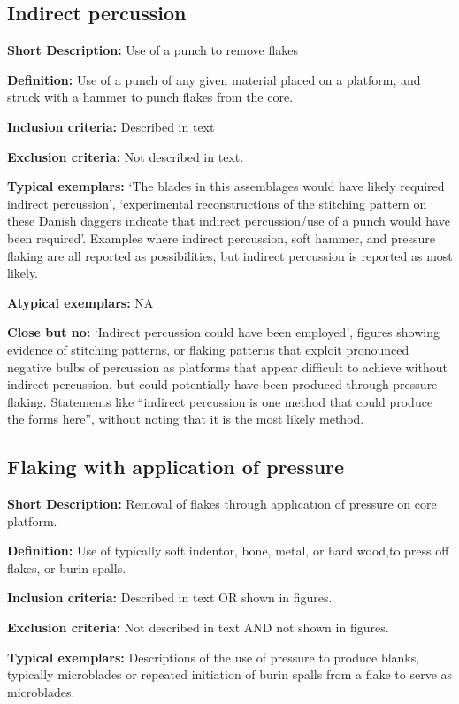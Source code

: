 \documentclass[
]{article}
\begin{document}
\subsection{Indirect percussion}\label{indirect-percussion}

\textbf{Short Description:} Use of a punch to remove flakes

\textbf{Definition:} Use of a punch of any given material placed on a
platform, and struck with a hammer to punch flakes from the core.

\textbf{Inclusion criteria:} Described in text

\textbf{Exclusion criteria:} Not described in text.

\textbf{Typical exemplars:} `The blades in this assemblages would have
likely required indirect percussion', `experimental reconstructions of
the stitching pattern on these Danish daggers indicate that indirect
percussion/use of a punch would have been required'. Examples where
indirect percussion, soft hammer, and pressure flaking are all reported
as possibilities, but indirect percussion is reported as most likely.

\textbf{Atypical exemplars:} NA

\textbf{Close but no:} `Indirect percussion could have been employed',
figures showing evidence of stitching patterns, or flaking patterns that
exploit pronounced negative bulbs of percussion as platforms that appear
difficult to achieve without indirect percussion, but could potentially
have been produced through pressure flaking. Statements like ``indirect
percussion is one method that could produce the forms here'', without
noting that it is the most likely method.

\subsection{Flaking with application of
pressure}\label{flaking-with-application-of-pressure}

\textbf{Short Description:} Removal of flakes through application of
pressure on core platform.

\textbf{Definition:} Use of typically soft indentor, bone, metal, or
hard wood,to press off flakes, or burin spalls.

\textbf{Inclusion criteria:} Described in text OR shown in figures.

\textbf{Exclusion criteria:} Not described in text AND not shown in
figures.

\textbf{Typical exemplars:} Descriptions of the use of pressure to
produce blanks, typically microblades or repeated initiation of burin
spalls from a flake to serve as microblades.
\end{document}
